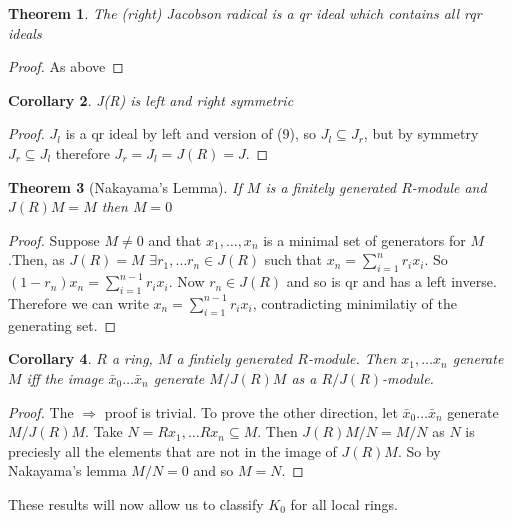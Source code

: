 \documentclass[a4paper,10pt]{article}
\newtheorem{thm}{Theorem}[subsection]
\newtheorem{cor}[thm]{Corollary}
\begin{document}
\begin{thm}
The (right) Jacobson radical is a qr ideal which contains all rqr ideals
\end{thm}
\begin{proof}
As above
\end{proof}

\begin{cor}
J(R) is left and right symmetric
\end{cor}
\begin{proof}
$J_{l}$ is a qr ideal by left and version of (9), so $J_{l}\subseteq J_{r}$, but by symmetry $J_{r}\subseteq J_{l}$ therefore $J_{r}=J_{l}=J(R)=J$.
\end{proof}

\begin{thm}[Nakayama's Lemma]
If $M$ is a finitely generated $R$-module and $J(R)M=M$ then $M=0$
\end{thm}
\begin{proof}
Suppose $M\neq 0$ and that $x_{1},\ldots ,x_{n}$ is a minimal set of generators for $M$.Then, as $J(R)=M$ $\exists r_{1} ,\ldots r_{n}\in J(R)$ such that $x_{n}=\sum_{i=1}^{n}r_{i}x_{i}$. So $(1-r_{n})x_{n}=\sum_{i=1}^{n-1}r_{i}x_{i}$. Now $r_{n}\in J(R)$ and so is qr and has a left inverse. Therefore we can write $x_{n}=\sum_{i=1}^{n-1}r_{i}x_{i}$, contradicting minimilatiy of the generating set.
\end{proof}

\begin{cor}
$R$ a ring, $M$ a fintiely generated $R$-module. Then $x_{1},\ldots x_{n}$ generate $M$ iff the image $\bar{x}_{0}\ldots \bar{x}_{n}$ generate $M/J(R)M$ as a $R/J(R)$-module.
\end{cor}
\begin{proof}
The $\Rightarrow$ proof is trivial. To prove the other direction, let $\bar{x}_{0}\ldots \bar{x}_{n}$ generate $M/J(R)M$. Take $N=Rx_{1},\ldots Rx_{n}\subseteq M$. Then $J(R)M/N=M/N$ as $N$ is preciesly all the elements that are not in the image of $J(R)M$. So by Nakayama's lemma $M/N=0$ and so $M=N$.
\end{proof}


These results will now allow us to classify $K_{0}$ for all local rings.
\end{document}
